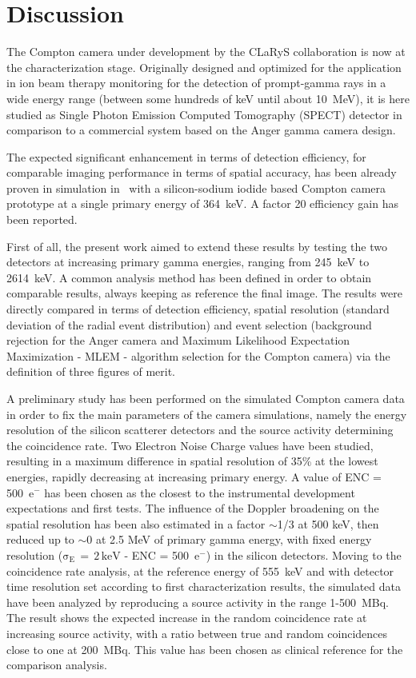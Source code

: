 \section{Discussion}\label{Conclusions}

The Compton camera under development by the CLaRyS collaboration is now at the characterization stage. Originally designed and optimized for the application in ion beam therapy monitoring  for the detection of prompt-gamma rays in a wide energy range (between some hundreds of keV until about 10~MeV), it is here studied as Single Photon Emission Computed Tomography (SPECT) detector in comparison to a commercial system based on the Anger gamma camera design.

The expected significant enhancement in terms of detection efficiency, for comparable imaging performance in terms of spatial accuracy, has been already proven in simulation in~\cite{HanComp} with a silicon-sodium iodide based Compton camera prototype at a single primary energy of 364~keV. A factor 20 efficiency gain has been reported.

First of all, the present work aimed to extend these results by testing the two detectors at increasing primary gamma energies, ranging from 245~keV to 2614~keV. A common analysis method has been defined in order to obtain comparable results, always keeping as reference the final image. The results were directly compared in terms of  detection efficiency, spatial resolution (standard deviation of the radial event distribution) and event selection (background rejection for the Anger camera and Maximum Likelihood Expectation Maximization - MLEM - algorithm selection for the Compton camera) via the definition of three figures of merit.

A preliminary study has been performed on the simulated Compton camera data in order to fix the main parameters of the camera simulations, namely the energy resolution of the silicon scatterer detectors and the source activity determining the coincidence rate. Two Electron Noise Charge values have been studied, resulting in a maximum difference in spatial resolution of 35\% at the lowest energies, rapidly decreasing at increasing primary energy. A value of ENC = 500~e$^-$ has been chosen as the closest to the instrumental development expectations and first tests. The influence of the Doppler broadening on the spatial resolution has been also estimated in a factor $\sim$1/3 at 500 keV, then reduced up to $\sim$0 at 2.5 MeV of primary gamma energy, with fixed energy resolution ($\mathrm{\sigma_{E}\,=\,2\,keV}$ - ENC = 500~e$^-$) in the silicon detectors. Moving to the coincidence rate analysis, at the reference energy of 555~keV and with detector time resolution set according to first characterization results, the simulated data have been analyzed by reproducing a source activity in the range 1-500~MBq. The result shows the expected increase in the random coincidence rate at increasing source activity, with a ratio between true and random coincidences close to one at 200~MBq. This value has been chosen as clinical reference for the comparison analysis.

